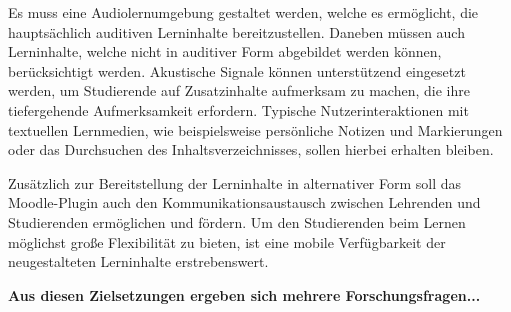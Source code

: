 Es muss eine Audiolernumgebung gestaltet werden, welche es ermöglicht, die hauptsächlich auditiven Lerninhalte bereitzustellen. Daneben müssen auch Lerninhalte, welche nicht in auditiver Form abgebildet werden können, berücksichtigt werden. Akustische Signale können unterstützend eingesetzt werden, um Studierende auf Zusatzinhalte aufmerksam zu machen, die ihre tiefergehende Aufmerksamkeit erfordern. Typische Nutzerinteraktionen mit textuellen Lernmedien, wie beispielsweise persönliche Notizen und Markierungen oder das Durchsuchen des Inhaltsverzeichnisses, sollen hierbei erhalten bleiben.

Zusätzlich zur Bereitstellung der Lerninhalte in alternativer Form soll das Moodle-Plugin auch den Kommunikationsaustausch zwischen Lehrenden und Studierenden ermöglichen und fördern. Um den Studierenden beim Lernen möglichst große Flexibilität zu bieten, ist eine mobile Verfügbarkeit der neugestalteten Lerninhalte erstrebenswert.

\textbf{Aus diesen Zielsetzungen ergeben sich mehrere Forschungsfragen...}







